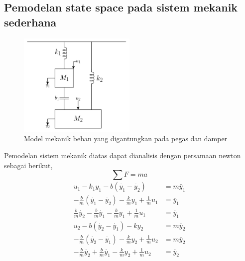 \documentclass[../main.tex]{subfiles}
\begin{document}
        \subsection{Pemodelan state space pada sistem mekanik sederhana}
            \begin{figure}[H]
                \centering
                \includegraphics[width = 0.5\textwidth]{assets/image/soal_pemodelan_pegas_damper.png}
                \caption{Model mekanik beban yang digantungkan pada pegas dan damper}
                \label{gambar_4}
            \end{figure}
            Pemodelan sistem mekanik diatas dapat dianalisis dengan persamaan newton sebagai berikut,
            \begin{equation*}
                \sum F = ma
            \end{equation*}
            \begin{equation}
                \begin{split}
                    u_1 - k_1y_1 - b(\dot{y_1} - \dot{y_2}) &= m\ddot{y_1} \\[5pt]
                    -\frac{b}{m}(\dot{y_1} - \dot{y_2}) - \frac{k}{m} y_1 + \frac{1}{m} u_1 &= \ddot{y_1}\\[5pt]
                    \frac{b}{m} \dot{y_2} - \frac{b}{m} \dot{y_1} - \frac{k}{m} y_1 + \frac{1}{m} u_1 &= \ddot{y_1}
                    \label{persamaan_1}
                \end{split}
            \end{equation}
            \begin{equation}
                \begin{split}
                    u_2 - b(\dot{y_2} - \dot{y_1}) - k y_2 &= m \ddot{y_2} \\[5pt]
                    - \frac{b}{m} (\dot{y_2} - \dot{y_1}) - \frac{k}{m} y_2 + \frac{1}{m} u_2 &= m\ddot{y_2} \\[5pt]
                    - \frac{b}{m} \dot{y_2} + \frac{b}{m} \dot{y_1} - \frac{k}{m} y_2 + \frac{1}{m} u_2 &= \ddot{y_2}
                \end{split}
            \end{equation}
\end{document}
